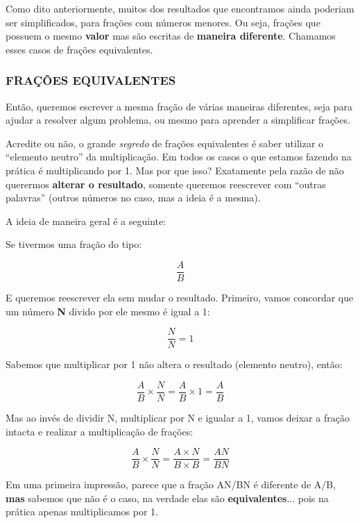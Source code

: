 Como dito anteriormente, muitos dos resultados que encontramos ainda poderiam ser simplificados, para frações com números menores. Ou seja, frações que possuem o mesmo \textbf{valor} mas são escritas de \textbf{maneira diferente}. Chamamos esses casos de frações equivalentes.

\subsubsection{FRAÇÕES EQUIVALENTES}

Então, queremos escrever a mesma fração de várias maneiras diferentes, seja para ajudar a resolver algum problema, ou mesmo para aprender a simplificar frações.

Acredite ou não, o grande \textit{segredo} de frações equivalentes é saber utilizar o ``elemento neutro'' da multiplicação. Em todos os casos o que estamos fazendo na prática é multiplicando por 1. Mas por que isso? Exatamente pela razão de não querermos \textbf{alterar o resultado}, somente queremos reescrever com ``outras palavras'' (outros números no caso, mas a ideia é a mesma).

A ideia de maneira geral é a seguinte:

\begin{exemplo}
    Se tivermos uma fração do tipo:

    \begin{equation}
        \frac{A}{B}
    \end{equation}

    E queremos reescrever ela sem mudar o resultado. Primeiro, vamos concordar que um número \textbf{N} divido por ele mesmo é igual a 1:

    \begin{equation}
        \frac{N}{N}=1
    \end{equation}

    Sabemos que multiplicar por 1 não altera o resultado (elemento neutro), então:

    \begin{equation}
        \frac{A}{B}\times \frac{N}{N} =\frac{A}{B} \times 1 = \frac{A}{B}
    \end{equation}

    Mas ao invés de dividir N, multiplicar por N e igualar a 1, vamos deixar a fração intacta e realizar a multiplicação de frações:

    \begin{equation}
        \frac{A}{B}\times \frac{N}{N} = \frac{A\times N}{B \times B} = \frac{AN}{BN}
    \end{equation}

    Em uma primeira impressão, parece que a fração AN/BN é diferente de A/B, \textbf{mas} sabemos que não é o caso, na verdade elas são \textbf{equivalentes}... pois na prática apenas multiplicamos por 1.
\end{exemplo}

